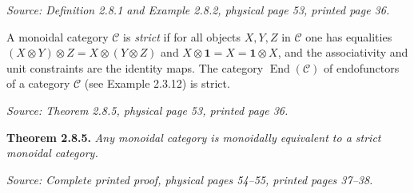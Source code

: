 \documentclass[11pt]{article}
\newcommand{\cC}{\mathcal C}
\newcommand{\one}{\mathbf 1}
\newcommand{\End}{\operatorname{End}}
\newcommand{\sourceloc}[1]{\par\smallskip\noindent\textit{Source: #1.}\par\nopagebreak[4]\smallskip}
\begin{document}
\sourceloc{Definition 2.8.1 and Example 2.8.2, physical page 53, printed page 36}
A monoidal category $\cC$ is \emph{strict} if for all objects $X,Y,Z$ in $\cC$
one has equalities $(X\otimes Y)\otimes Z=X\otimes(Y\otimes Z)$ and
$X\otimes\one=X=\one\otimes X$, and the associativity and unit constraints
are the identity maps.
The category $\End(\cC)$ of endofunctors of a category $\cC$ (see Example 2.3.12) is strict.

\clearpage
\sourceloc{Theorem 2.8.5, physical page 53, printed page 36}
\noindent\textbf{Theorem 2.8.5.}
\emph{Any monoidal category is monoidally equivalent to a strict monoidal category.}

\sourceloc{Complete printed proof, physical pages 54--55, printed pages 37--38}
\end{document}
